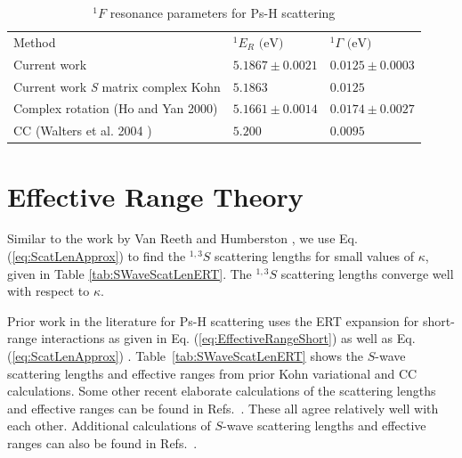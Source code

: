 \documentclass[preprint,showpacs,showkeys,preprintnumbers,amsmath,amssymb,longbibliography,pra,aps]{revtex4-1}
\begin{document}
\begin{table}[H]
\begin{center}
\begin{ruledtabular}
\begin{tabular}{l l l}
Method & $^1E_R \text{ (eV)}$ & $^1\Gamma \text{ (eV)}$ \\
\colrule
Current work & $5.1867 \pm 0.0021$ & $0.0125 \pm 0.0003$ \\
Current work \emph{S} matrix complex Kohn & $5.1863$ & $0.0125$ \\
Complex rotation (Ho and Yan 2000) \cite{Ho2000} & $5.1661 \pm 0.0014$ & $0.0174 \pm 0.0027$  \\
CC (Walters et al. 2004 \cite{Walters2004}) & $5.200$ & $0.0095$ \\
\end{tabular}
\end{ruledtabular}
\caption{$^1F$ resonance parameters for Ps-H scattering}
\label{tab:FWaveResonances}
\end{center}
\end{table}



\section{Effective Range Theory}

Similar to the work by Van Reeth and Humberston \cite{VanReeth2003}, we use 
Eq. (\ref{eq:ScatLenApprox}) to find the $^{1,3}S$ scattering lengths for small 
values of $\kappa$, given in Table \ref{tab:SWaveScatLenERT}. The $^{1,3}S$
scattering lengths converge well with respect to $\kappa$.

Prior work in the literature for Ps-H scattering
\cite{Blackwood2002,Ivanov2002,Walters2004,VanReeth2003}
uses the ERT expansion for short-range 
interactions as given in Eq. (\ref{eq:EffectiveRangeShort})
as well as Eq. (\ref{eq:ScatLenApprox}) \cite{VanReeth2003}.
Table~\ref{tab:SWaveScatLenERT}
shows the $S$-wave scattering lengths and effective
ranges from prior Kohn variational \cite{VanReeth2003} and CC
\cite{Blackwood2002,Walters2004} calculations. Some other recent elaborate
calculations of the scattering lengths and effective ranges can be found in
Refs.~\cite{Sinha2000,Ivanov2001,Chiesa2002,Ivanov2002}.
These all agree relatively well with each 
other. Additional calculations of $S$-wave scattering lengths and effective 
ranges can also be found in
Refs.~\cite{Hara1975,Page1976,Drachman1975,
Drachman1976,Campbell1998,Adhikari1999,Adhikari2001b}.
\end{document}
